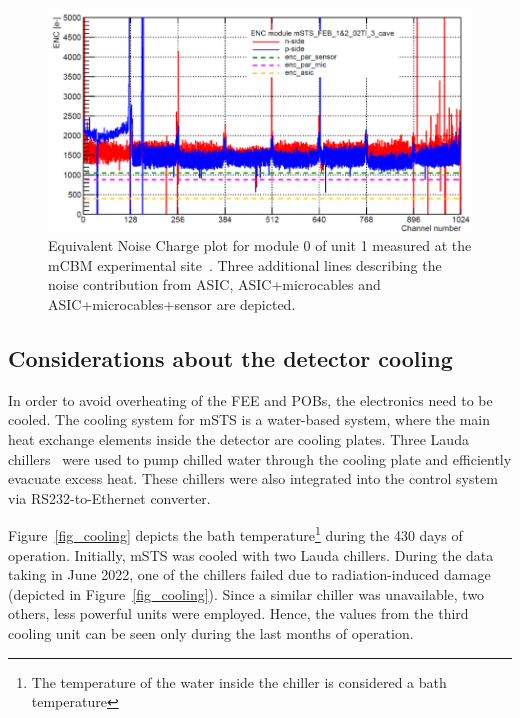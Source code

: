 \begin{figure}[!h]
\centering
\includegraphics[width=0.9\columnwidth]{Chapter6/DCS/images/U1M1_ENC.png}
\caption{Equivalent Noise Charge plot for module 0 of unit 1 measured at the \gls{mCBM} experimental site~\cite{Adrian}. Three additional lines describing the noise contribution from ASIC, ASIC+microcables and ASIC+microcables+sensor are depicted.}
\label{fig_msts_ENC2}
\end{figure}


\subsection{Considerations about the detector cooling}
\label{msts_cooling}
In order to avoid overheating of the \gls{FEE} and \glspl{POB}, the electronics need to be cooled. The cooling system for \gls{mSTS} is a water-based  system, where the main heat exchange elements inside the detector are cooling plates. Three Lauda chillers~\cite{Lauda1} were used to pump chilled water through the cooling plate and efficiently evacuate excess heat. These chillers were also integrated into the control system via RS232-to-Ethernet converter.

Figure~\ref{fig_cooling} depicts the bath temperature\footnote{The temperature of the water inside the chiller is considered a bath temperature} during the 430 days of operation. Initially, \gls{mSTS} was cooled with two Lauda chillers. During the data taking in June 2022, one of the chillers failed due to radiation-induced damage (depicted in Figure~\ref{fig_cooling}). Since a similar chiller was unavailable, two others, less powerful units were employed. Hence, the values from the third cooling unit can be seen only during the last months of operation. 

